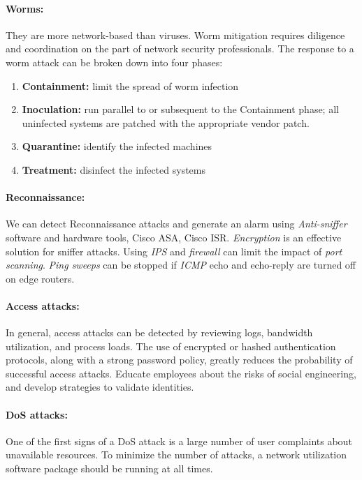 \paragraph{Worms:} They are more network-based than viruses. Worm mitigation requires diligence and coordination on the part of network security professionals. The response to a worm attack can be broken down into four phases:

\begin{enumerate}
\item \textbf{\textbf{Containment}:} limit the spread of worm infection
\item \textbf{Inoculation:} run parallel to or subsequent to the Containment phase; all uninfected systems are patched with the appropriate vendor patch.
\item \textbf{Quarantine:} identify the infected machines
\item \textbf{Treatment:} disinfect the infected systems
\end{enumerate}

\paragraph{Reconnaissance:} We can detect Reconnaissance attacks and generate an alarm using \emph{Anti-sniffer} software and hardware tools, Cisco ASA, Cisco ISR. \emph{Encryption} is an effective solution for sniffer attacks. Using \emph{IPS} and \emph{firewall} can limit the impact of \emph{port scanning}. \emph{Ping sweeps} can be stopped if \emph{ICMP} echo and echo-reply are turned off on edge routers. 

\paragraph{Access attacks:} In general, access attacks can be detected by reviewing logs, bandwidth utilization, and process loads. The use of encrypted or hashed authentication protocols, along with a strong password policy, greatly reduces the probability of successful access attacks. Educate employees about the risks of social engineering, and develop strategies to validate identities.

\paragraph{DoS attacks:} One of the first signs of a DoS attack is a large number of user complaints about unavailable resources. To minimize the number of attacks, a network utilization software package should be running at all times. 

